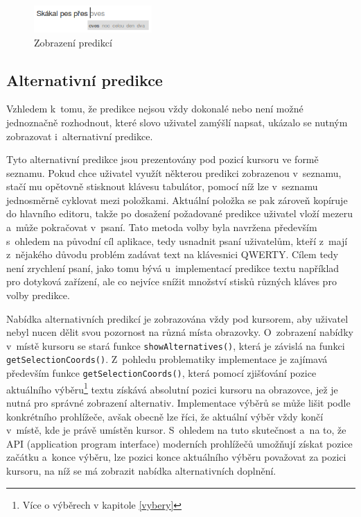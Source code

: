 \documentclass[a4paper,11pt,openany]{book} %
\begin{document}
\begin{figure}[ht]
	\centering
	\includegraphics[width=0.4\textwidth]{nlp_predict_1}
	\caption{Zobrazení predikcí}
	\label{fig:nlp-predict}
\end{figure}

\subsection{Alternativní predikce}

Vzhledem k~tomu, že predikce nejsou vždy dokonalé nebo není možné jednoznačně rozhodnout, které slovo uživatel zamýšlí napsat, ukázalo se nutným zobrazovat i~alternativní predikce. 

Tyto alternativní predikce jsou prezentovány pod pozicí kursoru ve formě seznamu. Pokud chce uživatel využít některou predikci zobrazenou v~seznamu, stačí mu opětovně stisknout klávesu tabulátor, pomocí níž lze v~seznamu jednosměrně cyklovat mezi položkami. Aktuální položka se pak zároveň kopíruje do hlavního editoru, takže po dosažení požadované predikce uživatel vloží mezeru a~může pokračovat v~psaní. Tato metoda volby byla navržena především s~ohledem na původní cíl aplikace, tedy usnadnit psaní uživatelům, kteří z~mají z~nějakého důvodu problém zadávat text na klávesnici QWERTY. Cílem tedy není zrychlení psaní, jako tomu bývá u~implementací predikce textu například pro dotyková zařízení, ale co nejvíce snížit množství stisků různých kláves pro volby predikce.

Nabídka alternativních predikcí je zobrazována vždy pod kursorem, aby uživatel nebyl nucen dělit svou pozornost na různá místa obrazovky. O~zobrazení nabídky v~místě kursoru se stará funkce {\tt show\-Alternatives()}, která je závislá na funkci {\tt get\-Selection\-Coords()}. Z~pohledu problematiky implementace je zajímavá především funkce {\tt get\-Selection\-Coords()}, která pomocí zjišťování pozice aktuálního výběru\footnote{Více o výběrech v kapitole \ref{vybery}} textu získává absolutní pozici kursoru na obrazovce, jež je nutná pro správné zobrazení alternativ. Implementace výběrů se může lišit podle konkrétního prohlížeče, avšak obecně lze říci, že aktuální výběr vždy končí v~místě, kde je právě umístěn kursor. S~ohledem na tuto skutečnost a~na to, že API (application program interface) moderních prohlížečů umožňují získat pozice začátku a~konce výběru, lze pozici konce aktuálního výběru považovat za pozici kursoru, na níž se má zobrazit nabídka alternativních doplnění. 
\end{document}
